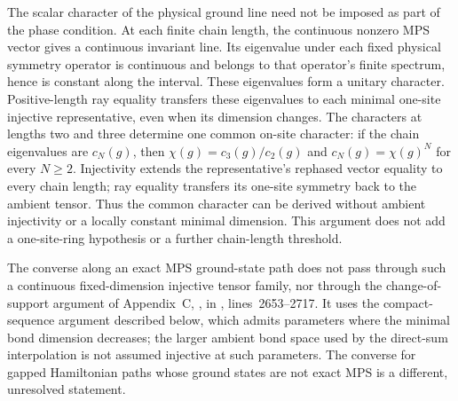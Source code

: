 \documentclass{article}
\begin{document}
The scalar character of the physical ground line need not be imposed as
part of the phase condition. At each finite chain length, the continuous
nonzero MPS vector gives a continuous invariant line. Its eigenvalue under
each fixed physical symmetry operator is continuous and belongs to that
operator's finite spectrum, hence is constant along the interval. These
eigenvalues form a unitary character. Positive-length ray equality transfers
these eigenvalues to each minimal one-site injective representative,
even when its dimension changes. The characters at lengths two and three
determine one common on-site character: if the chain eigenvalues are $c_N(g)$, then
$\chi(g)=c_3(g)/c_2(g)$ and $c_N(g)=\chi(g)^N$ for every $N\geq2$.
Injectivity extends the representative's rephased vector equality to every
chain length; ray equality transfers its one-site symmetry back to the
ambient tensor. Thus the common character can be derived without ambient
injectivity or a locally constant minimal dimension.
This argument does not add a one-site-ring hypothesis or a further
chain-length threshold.

The converse along an exact MPS ground-state path does not pass through
such a continuous fixed-dimension injective tensor family, nor through the
change-of-support argument of Appendix~C,
, in
, lines~2653--2717. It uses the
compact-sequence argument described below, which admits parameters where
the minimal bond dimension decreases; the larger ambient bond space used by
the direct-sum interpolation is not assumed injective at such parameters.
The converse for gapped Hamiltonian paths whose ground states are not exact
MPS is a different, unresolved statement.
\end{document}
